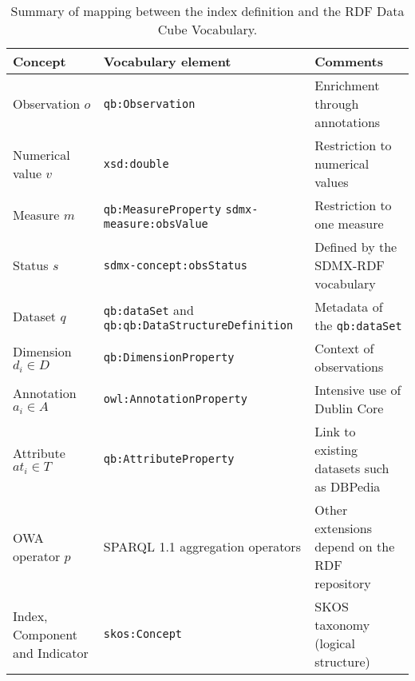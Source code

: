 \begin{table}[!htb]
\renewcommand{\arraystretch}{1.3}
\scriptsize
\begin{center}
\begin{tabular}{|p{3cm}||p{4.8cm}|p{4.5cm}|}
\hline
  \textbf{Concept} & \textbf{Vocabulary element} &  \textbf{Comments}  \\  \hline
   Observation $o$ & \texttt{qb:Observation} &  Enrichment through annotations\\ \hline
   Numerical value $v$ & \texttt{xsd:double} & Restriction to numerical values  \\ \hline
   Measure $m$ & \texttt{qb:MeasureProperty} \texttt{sdmx-measure:obsValue} & Restriction to one measure \\ \hline
   Status $s$ & \texttt{sdmx-concept:obsStatus} & Defined by the SDMX-RDF vocabulary\\ \hline
   Dataset $q$ & \texttt{qb:dataSet} and \texttt{qb:qb:DataStructureDefinition} &  Metadata of the \texttt{qb:dataSet}\\ \hline
   Dimension $d_i \in D$ & \texttt{qb:DimensionProperty} & Context of observations \\ \hline
   Annotation $a_i \in A$ & \texttt{owl:AnnotationProperty} &  Intensive use of Dublin Core\\ \hline
   Attribute $at_i \in T$ & \texttt{qb:AttributeProperty} & Link to existing datasets such as DBPedia \\ \hline
   OWA operator $p$ &  SPARQL 1.1 aggregation operators & Other extensions depend on the RDF repository \\ \hline
   Index, Component and Indicator & \texttt{skos:Concept} & SKOS taxonomy (logical structure) \\ \hline
  \hline
  \end{tabular}
  \caption{Summary of mapping between the index definition and the RDF Data Cube Vocabulary.}
  \label{index-to-rdf}
  \end{center}
\end{table} 

